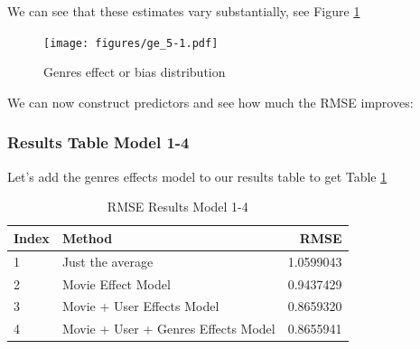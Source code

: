\documentclass[
]{article}
\newenvironment{Shaded}{}{}
\newcommand{\AttributeTok}[1]{\textcolor[rgb]{0.49,0.56,0.16}{#1}}
\newcommand{\DecValTok}[1]{\textcolor[rgb]{0.25,0.63,0.44}{#1}}
\newcommand{\FloatTok}[1]{\textcolor[rgb]{0.25,0.63,0.44}{#1}}
\newcommand{\FunctionTok}[1]{\textcolor[rgb]{0.02,0.16,0.49}{#1}}
\newcommand{\NormalTok}[1]{#1}
\newcommand{\OtherTok}[1]{\textcolor[rgb]{0.00,0.44,0.13}{#1}}
\newcommand{\SpecialCharTok}[1]{\textcolor[rgb]{0.25,0.44,0.63}{#1}}
\newcommand{\StringTok}[1]{\textcolor[rgb]{0.25,0.44,0.63}{#1}}
\begin{document}
We can see that these estimates vary substantially, see Figure
\ref{fig:model_4}

\begin{figure}
\centering
\texttt{[image: figures/ge\_5-1.pdf]}
\caption{Genres effect or bias distribution\label{fig:model_4}}
\end{figure}

We can now construct predictors and see how much the RMSE improves:

\begin{Shaded}
\end{Shaded}

\newpage

\hypertarget{results-table-model-1-4}{%
\subsubsection{Results Table Model 1-4}\label{results-table-model-1-4}}

Let's add the genres effects model to our results table to get Table
\ref{tbl:rmse_results_model_1-4}

\begin{table}[H]

\caption{\label{tab:ge_7}RMSE Results Model 1-4\label{tbl:rmse_results_model_1-4}}
\centering
\fontsize{7}{9}\selectfont
\begin{tabular}[t]{llr}
\toprule
Index & Method & RMSE\\
\midrule
1 & Just the average & 1.0599043\\
2 & Movie Effect Model & 0.9437429\\
3 & Movie + User Effects Model & 0.8659320\\
4 & Movie + User + Genres Effects Model & 0.8655941\\
\bottomrule
\end{tabular}
\end{table}
\end{document}

